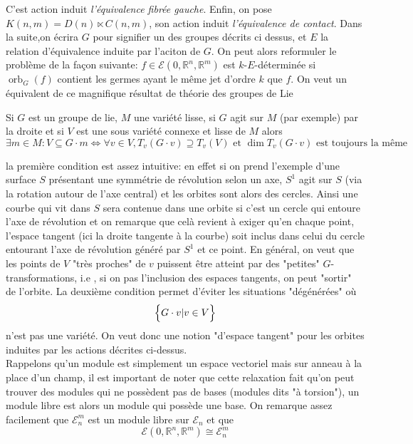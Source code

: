 \documentclass[a4paper,12pt,oneside,titlepage]{article}
\newcommand{\R}[0]{\mathbb{R}}
\theoremstyle{definition}
\theoremstyle{plain}
\begin{document}
C'est action induit \textit{l'équivalence fibrée gauche}. Enfin, on pose $K(n,m)= D(n)\ltimes C(n,m) $, son action induit \textit{l'équivalence de contact}. Dans la suite,on écrira $G$ pour signifier un des groupes décrits ci dessus, et $E$ la relation d'équivalence induite par l'aciton de $G$. On peut alors reformuler le problème de la façon suivante: $f\in\mathcal{E}(0,\R^n,\R^m)$  est $k$-$E$-déterminée si $\operatorname{orb}_G(f)$ contient les germes ayant le même jet d'ordre $k$ que $f$. On veut un équivalent de ce magnifique résultat de théorie des groupes de Lie 
\begin{theobox}{}{}
    Si $G$ est un groupe de lie, $M$ une variété lisse, si $G$ agit sur $M$ (par exemple) par la droite et si $V$ est une sous variété connexe et lisse de $M$ alors 
    \begin{equation*}
        \exists m\in M : V \subseteq G\cdot m \Leftrightarrow \forall v\in V, T_v (G\cdot v) \supseteq T_v (V)\text{ et } \dim T_v (G\cdot v) \text{ est toujours la même }
    \end{equation*}
\end{theobox}
la première condition est assez intuitive: en effet si on prend l'exemple d'une surface $S$ présentant une symmétrie de révolution selon un axe, $S^1$ agit sur $S$ (via la rotation autour de l'axe central) et les orbites sont alors des cercles. Ainsi une courbe qui vit dans $S$ sera contenue dans une orbite si c'est un cercle qui entoure l'axe de révolution et on remarque que celà revient à exiger qu'en chaque point, l'espace tangent (ici la droite tangente à la courbe) soit inclus dans celui du cercle entourant l'axe de révolution généré par $S^1$ et ce point. En général, on veut que les points  de $V$ "très proches" de $v$ puissent être atteint par des "petites" $G$-transformations, i.e , si on pas l'inclusion des espaces tangents, on peut "sortir" de l'orbite. La deuxième condition permet d'éviter les situations "dégénérées" où 
\begin{equation*}
    \Bigl\{G\cdot v | v\in V\Bigr\}  
\end{equation*}
n'est pas une variété. On veut donc une notion "d'espace tangent" pour les orbites induites par les actions décrites ci-dessus.\\
Rappelons qu'un module est simplement un espace vectoriel mais sur anneau à la place d'un champ, il est important de noter que cette relaxation fait qu'on peut trouver des modules qui ne possèdent pas de bases (modules dits "à torsion"), un module libre est alors un module qui possède une base. On remarque assez facilement que $\mathcal{E}_n^m$ est un module libre sur $\mathcal{E}_n$
et que
\begin{equation*}
    \mathcal{E}(0,\R^n,\R^m)\cong \mathcal{E}_n^m
\end{equation*}
\end{document}
